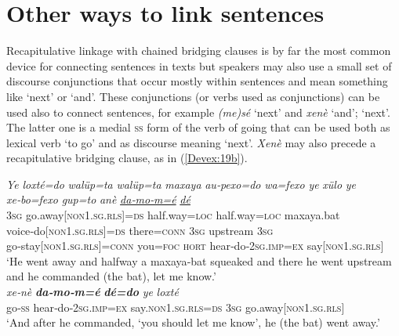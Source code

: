 \documentclass[output=paper]{LSP/langsci}
\begin{document}
	
\section{Other ways to link sentences} 
\label{Devotherways}
Recapitulative linkage with chained bridging clauses is by far the most common device for connecting sentences in   texts but speakers may also use a small set of discourse conjunctions that occur mostly within sentences and mean something like `next' or `and'. These conjunctions (or verbs used as conjunctions) can be used also to connect sentences, for example \textit{(me)sé} `next' and \textit{xenè} `and'; `next'. The latter one is a medial \textsc{ss} form of the verb of going that can be used both as lexical verb `to go' and as discourse  meaning `next'.  \textit{Xenè} may also precede a recapitulative bridging clause, as in (\ref{Devex:19b}). 

\begin{exe}
\ex \label{Devex:19ab}
\begin{xlist}
\ex \label{Devex:19a}			     
\gll \textit{Ye} \textit{loxté=do} \textit{walüp=ta} \textit{walüp=ta} \textit{maxaya} \textit{au‑pexo=do} \textit{wa=fexo} \textit{ye} \textit{xülo} \textit{ye} \textit{xe‑bo=fexo} \textit{gup=to} \textit{anè} \underline{\textit{da‑mo‑m=é}} \underline{\textit{dé}}\\
\textsc{3sg} go.away[\textsc{non1.sg.rls}]=\textsc{ds} half.way=\textsc{loc} half.way=\textsc{loc} maxaya.bat voice‑do[\textsc{non1.sg.rls}]=\textsc{ds} there=\textsc{conn} \textsc{3sg} upstream \textsc{3sg} go‑stay[\textsc{non1.sg.rls}]=\textsc{conn} you=\textsc{foc} \textsc{hort} hear‑do‑\textsc{2sg.imp=ex} say[\textsc{non1.sg.rls}]\\
\glt `He went away and halfway a maxaya‑bat squeaked and there he went upstream and he commanded (the bat), let me know.'\\

\ex \label{Devex:19b}			     
\gll \textit{xe‑nè} \textbf{\textit{da‑mo‑m=é}} \textbf{\textit{dé=do}} \textit{ye} \textit{loxté} \\        		
go‑\textsc{ss} hear‑do‑\textsc{2sg.imp=ex} say.\textsc{non1.sg.rls=ds} \textsc{3sg} go.away[\textsc{non1.sg.rls}]\\
\glt `And after he commanded, `you should let me know', he (the bat) went away.'\\ 
\end{xlist}
\end{exe}
\end{document}
